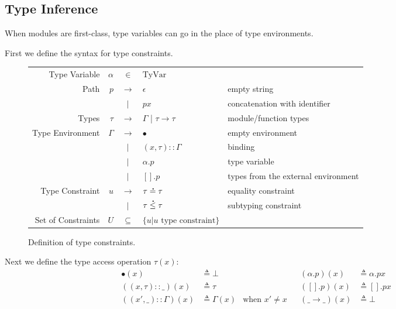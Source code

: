 \documentclass{article}
\theoremstyle{definition}
\newcommand*{\vbar}{|}
\newcommand*{\cons}{::}
\newcommand*{\A}[1]{\overset{\,_{\mbox{\Large .}}}{#1}}
\newcommand*{\TyVar}{\text{TyVar}}
\begin{document}
\subsection{Type Inference}

When modules are first-class, type variables can go in the place of type environments.

First we define the syntax for type constraints.
\begin{figure}[h!]
  \centering
  \begin{tabular}{rrcll}
    Type Variable      & $\alpha$ & $\in$         & $\TyVar$                                                               \\
    Path               & $p$      & $\rightarrow$ & $\epsilon$                       & empty string                        \\
                       &          & $\vbar$       & $p x$                            & concatenation with identifier       \\
    Types              & $\tau$   & $\rightarrow$ & $\Gamma$ | $\tau\rightarrow\tau$ & module/function types               \\
    Type Environment   & $\Gamma$ & $\rightarrow$ & $\bullet$                        & empty environment                   \\
                       &          & $\vbar$       & $(x,\tau)\cons \Gamma$           & binding                             \\
                       &          & $\vbar$       & $\alpha.p$                       & type variable                       \\
                       &          & $\vbar$       & $[].p$                           & types from the external environment \\
    Type Constraint    & $u$      & $\rightarrow$ & $\tau\A{=}\tau$                  & equality constraint                 \\
                       &          & $\vbar$       & $\tau\A{\le}\tau$                & subtyping constraint                \\
    Set of Constraints & $U$      & $\subseteq$   & $\{u|u\text{ type constraint}\}$
  \end{tabular}
  \caption{Definition of type constraints.}
  \label{fig:typeqdom}
\end{figure}

Next we define the type access operation $\tau(x)$:
\begin{align*}
  \bullet(x)              & \triangleq\bot      &                      &  & (\alpha.p)(x)        & \triangleq\alpha.px \\
  ((x,\tau)\cons\_)(x)    & \triangleq\tau      &                      &  & ([].p)(x)            & \triangleq[].px     \\
  ((x',\_)\cons\Gamma)(x) & \triangleq\Gamma(x) & \text{when }x'\neq x &  & (\_\rightarrow\_)(x) & \triangleq\bot
\end{align*}
\end{document}
